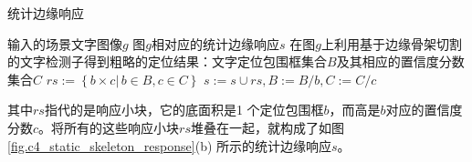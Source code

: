         \begin{algorithm} \renewcommand{\algorithmicrequire}{\textbf{输入:}}	\renewcommand{\algorithmicensure}{\textbf{输出:}}
    	\caption{统计边缘响应}
    	\label{alg:c4_static_skeleton_response}
    	\begin{algorithmic}[1]
    		\REQUIRE 输入的场景文字图像$g$
    		\ENSURE 图$g$相对应的统计边缘响应$s$
            \STATE 在图$g$上利用基于边缘骨架切割的文字检测子得到粗略的定位结果：文字定位包围框集合$B$及其相应的置信度分数集合$C$
    		\REPEAT
            \STATE $rs:=\left\{ b \times c  |\,b \in B, c \in C\right\}$
            \STATE $s:=s\cup rs,B:=B / b,C:=C / c$
    	\end{algorithmic}
        \end{algorithm}

        其中$rs$指代的是响应小块，它的底面积是1 个定位包围框$b$，而高是$b$对应的置信度分数$c$。将所有的这些响应小块$rs$堆叠在一起，就构成了如图\ref{fig.c4_static_skeleton_response}(b) 所示的统计边缘响应$s$。

